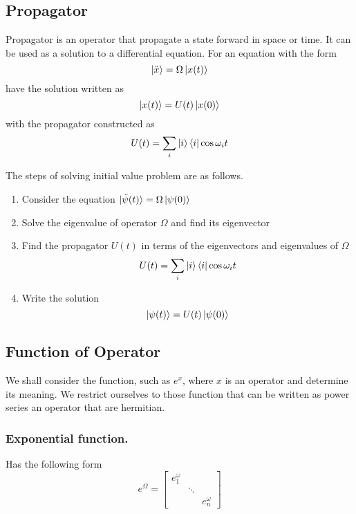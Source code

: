 \documentclass[../main.tex]{subfiles}
\begin{document}
\subsection*{Propagator}
Propagator is an operator that propagate a state forward in space or time.
It can be used as a solution to a differential equation.
For an equation with the form
\begin{equation*}
	\ket{\ddot{x}}=\Omega \ket{x(t)}
\end{equation*}
have the solution written as
\begin{equation*}
	\ket{x(t)}=U(t)\ket{x(0)}
\end{equation*}
with the propagator constructed as
\begin{equation*}
	U(t)= \sum_i\ket{i} \bra{i}\cos \omega_i t
\end{equation*}

The steps of solving initial value problem are as follows.
\begin{enumerate}
	\item Consider the equation $\ket{\ddot{\psi}(t)}=\Omega\ket{\psi(0)}$
	\item Solve the eigenvalue of operator $\Omega$ and find its eigenvector
	\item Find the propagator $U(t)$ in terms of the eigenvectors and eigenvalues
	      of $\Omega$
	      \begin{equation*}
		      U(t)= \sum_i\ket{i} \bra{i}\cos \omega_i t
	      \end{equation*}
	\item Write the solution
	      \begin{equation*}
		      \ket{\psi(t)}=U(t)\ket{\psi(0)}
	      \end{equation*}
\end{enumerate}

\subsection*{Function of Operator}
We shall consider the function, such as $e^x$, where $x$ is an operator and determine its meaning.
We restrict ourselves to those function that can be written as power series an operator that are hermitian.

\subsubsection*{Exponential function.}
Has the following form
\begin{equation*}
	e^\Omega=
	\begin{bmatrix}
		e^\omega_1 &        &            \\
		           & \ddots &            \\
		           &        & e^\omega_n
	\end{bmatrix}
\end{equation*}
\end{document}
